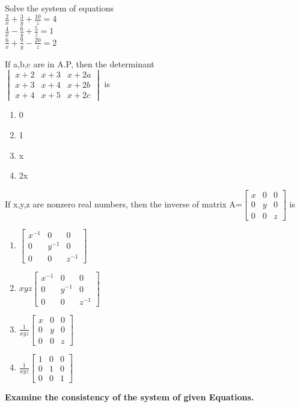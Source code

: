 \item Solve the system of equations \\$\frac{2}{x}+\frac{3}{y}+\frac{10}{z}=4$\\$\frac{4}{x}-\frac{6}{y}+\frac{5}{z}=1$\\$\frac{6}{x}+\frac{9}{y}-\frac{20}{z}=2$\\
\item If a,b,c are in A.P, then the determinant\\
 $\begin{vmatrix}
x+2&x+3&x+2a \\ x+3&x+4&x+2b \\x+4&x+5&x+2c
\end{vmatrix}$ is 
\begin{enumerate}
\item 0
\item 1
\item x
\item 2x
\end{enumerate}
\item If x,y,z are nonzero real numbers, then the inverse of matrix 
A=$\begin{bmatrix}
x&0&0 \\ 0&y&0 \\ 0&0&z
\end{bmatrix}$ is 
\begin{enumerate}
\item $\begin{bmatrix} x^{-1}&0&0 \\ 0&y^{-1}&0 \\ 0&0&z^{-1} \end{bmatrix}$ 
\item $xyz\begin{bmatrix} x^{-1}&0&0 \\ 0&y^{-1}&0 \\ 0&0&z^{-1} \end{bmatrix}$ 
\item $\frac{1}{xyz}\begin{bmatrix} x&0&0 \\ 0&y&0 \\ 0&0&z \end{bmatrix}$ 
\item $\frac{1}{xyz}\begin{bmatrix} 1&0&0 \\ 0&1&0 \\ 0&0&1 \end{bmatrix}$ 
\end{enumerate}
\textbf{Examine the consistency of the system of given Equations.}
